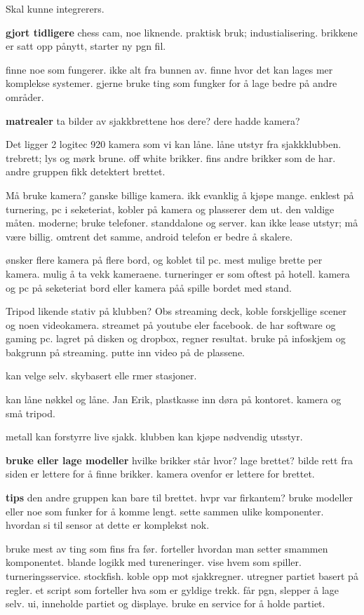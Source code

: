 Skal kunne integrerers. 

\textbf{gjort tidligere}
chess cam, noe liknende. praktisk bruk; industialisering. brikkene er satt opp pånytt, starter ny pgn fil. 

finne noe som fungerer. ikke alt fra bunnen av. finne hvor det kan lages mer komplekse systemer. gjerne bruke ting som fungker for å lage bedre på andre områder.  

\textbf{matrealer}
ta bilder av sjakkbrettene hos dere? dere hadde kamera?

Det ligger 2 logitec 920 kamera som vi kan låne. låne utstyr fra sjakkklubben. trebrett; lys og mørk brune. off white brikker. fins andre brikker som de har. andre gruppen fikk detektert brettet. 

Må bruke kamera? ganske billige kamera. ikk evanklig å kjøpe mange. enklest på turnering, pc i seketeriat, kobler på kamera og plasserer dem ut. den valdige måten. moderne; bruke telefoner. standdalone og server. kan ikke lease utstyr; må være billig. omtrent det samme, android telefon er bedre å skalere. 

ønsker flere kamera på flere bord, og koblet til pc. mest mulige brette per kamera. mulig å ta vekk kameraene. turneringer er som oftest på hotell. kamera og pc på seketeriat bord eller kamera påå spille bordet med stand. 

Tripod likende stativ på klubben? Obs streaming deck, koble forskjellige scener og noen videokamera. streamet på youtube eler facebook. de har software og gaming pc. lagret på disken og dropbox, regner resultat. bruke på infoskjem og bakgrunn på streaming. putte inn video på de plassene. 

kan velge selv. skybasert elle rmer stasjoner. 

kan låne nøkkel og låne. 
Jan Erik, plastkasse inn døra på kontoret. kamera og små tripod. 

metall kan forstyrre live sjakk. klubben kan kjøpe nødvendig utsstyr. 

\textbf{bruke eller lage modeller}
hvilke brikker står hvor? lage brettet? bilde rett fra siden er lettere for å finne brikker. kamera ovenfor er lettere for brettet. 

\textbf{tips}
den andre gruppen kan bare til brettet. hvpr var firkantem? bruke modeller eller noe som funker for å komme lengt. sette sammen ulike komponenter. hvordan si til sensor at dette er komplekst nok.

bruke mest av ting som fins fra før. forteller hvordan man setter smammen komponentet. blande logikk med tureneringer. vise hvem som spiller. turneringsservice. stockfish. koble opp mot sjakkregner. utregner partiet basert på regler. et script som forteller hva som er gyldige trekk. får pgn, slepper å lage selv. ui, inneholde partiet og displaye. bruke en service for å holde partiet. 

